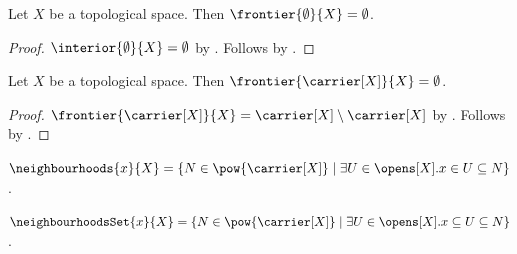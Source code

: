 \begin{proposition}\label{frontier_of_emptyset}
    Let $X$ be a topological space.
    Then $\frontier{\emptyset}{X} = \emptyset$.
\end{proposition}
\begin{proof}
    $\interior{\emptyset}{X}=\emptyset$
        by .
    Follows by .
\end{proof}

\begin{proposition}\label{frontier_of_carrier}
    Let $X$ be a topological space.
    Then $\frontier{\carrier[X]}{X} = \emptyset$.
\end{proposition}
\begin{proof}
    $\frontier{\carrier[X]}{X} = \carrier[X]\setminus\carrier[X]$
        by .
    Follows by .
\end{proof}

\begin{definition}\label{neighbourhoods}
    $\neighbourhoods{x}{X} = \{N\in\pow{\carrier[X]} \mid \exists U\in\opens[X]. x\in U\subseteq N\}$.
\end{definition}

\begin{definition}\label{neighbourhoods_set}
    $\neighbourhoodsSet{x}{X} = \{N\in\pow{\carrier[X]} \mid \exists U\in\opens[X]. x\subseteq U\subseteq N\}$.
\end{definition}
